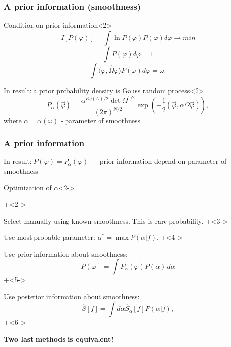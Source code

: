 \documentclass[8pt,pdf,hyperref={unicode}]{beamer}
\begin{document}
\begin{frame}
    \frametitle{A prior information (smoothness)}


\begin{block}{Condition on prior information}<2>
    {\LARGE                
        $$
        I[P(\varphi)] = \int \ln{P(\varphi)} P(\varphi) d\varphi \to min
        $$
        $$
        \int P(\varphi) d\varphi = 1
        $$    
        $$
        \int \langle \varphi,\hat{\Omega}\varphi \rangle P(\varphi) d\varphi = \omega,
        $$}
\end{block}

    \begin{block}{In result: a prior probability density is Gauss random process}<2>
{\LARGE         $$
        P_{\alpha}(\vec{\varphi})  = \frac{\alpha^{Rg(\Omega)/2}\det\Omega^{1/2}}{(2\pi)^{N/2}} \exp(-\frac{1}{2} (\vec{\varphi},\alpha\Omega\vec{\varphi})),
        $$
        where  $\alpha = \alpha(\omega)$ -  parameter of smoothness}
    \end{block}
\end{frame}

\begin{frame}
    \frametitle{A prior information}
    {\LARGE       In result:  $P(\varphi)  = P_{\alpha}(\varphi)$ --- prior information depend on parameter of smoothness}
    \begin{block}{Optimization of $\alpha$}<2->
        \begin{itemize}
            \onslide+<2->
{\LARGE     \item Select manually using known smoothness. This is rare probability.
            \onslide+<3->
            \item Use most probable parameter: $\alpha^* = \max P(\alpha|f).$
            \onslide+<4->
            \item Use prior information about smoothness: 
            $$
            P(\varphi)  = \int P_{\alpha}(\varphi) P(\alpha)~d\alpha
            $$
            \onslide+<5->
            \item Use posterior information about smoothness: 
            $$
            \hat{S}[f] = \int d\alpha \hat{S}_{\alpha}[f] P(\alpha|f),
            $$
            \onslide+<6->
            \item \textbf{Two last methods is equivalent!}

            }
        \end{itemize}
    \end{block}     
\end{frame}
\end{document}
